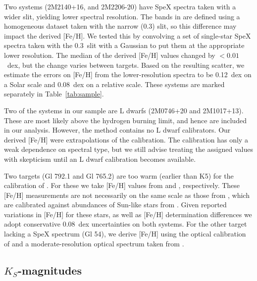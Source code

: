 \documentclass[twocolumn]{aastex62}
\begin{document}
Two systems (2M2140+16, and 2M2206-20) have SpeX spectra taken with a wider slit, yielding lower spectral resolution. The bands in \citet{Mann2014} are defined using a homogeneous dataset taken with the narrow (0.3\arcsec) slit, so this difference may impact the derived [Fe/H]. We tested this by convolving a set of single-star SpeX spectra taken with the 0.3\arcsec\ slit with a Gaussian to put them at the appropriate lower resolution. The median of the derived [Fe/H] values changed by $<0.01$~dex, but the change varies between targets. Based on the resulting scatter, we estimate the errors on [Fe/H] from the lower-resolution spectra to be 0.12~dex on a Solar scale and 0.08~dex on a relative scale. These systems are marked separately in Table~\ref{tab:sample}. 

Two of the systems in our sample are L dwarfs (2M0746+20 and 2M1017+13). These are most likely above the hydrogen burning limit, and hence are included in our analysis. However, the \citet{Mann2014} method contains no L dwarf calibrators. Our derived [Fe/H] were extrapolations of the \citet{Mann2014} calibration. The \citet{Mann2014} calibration has only a weak dependence on spectral type, but we still advise treating the assigned values with skepticism until an L dwarf calibration becomes available. 

Two targets (Gl 792.1 and Gl 765.2) are too warm (earlier than K5) for the calibration of \citet{Mann2013a}. For these we take [Fe/H] values from \citet{2011A&A...530A.138C} and \citet{2010A&ARv..18...67T}, respectively. These [Fe/H] measurements are not necessarily on the same scale as those from \citet{Mann2013a}, which are calibrated against abundances of Sun-like stars from \citet{2015ApJ...805..126B,2016ApJS..225...32B}. Given reported variations in [Fe/H] for these stars, as well as [Fe/H] determination differences \citep{2014AJ....148...54H,2016ApJS..226....4H} we adopt conservative 0.08~dex uncertainties on both systems. For the other target lacking a SpeX spectrum (Gl 54), we derive [Fe/H] using the optical calibration of \citet{Mann2013a} and a moderate-resolution optical spectrum taken from \citet{Gaidos2014}.

\subsection{$K_S$-magnitudes} \label{sec:mags}
\end{document}
